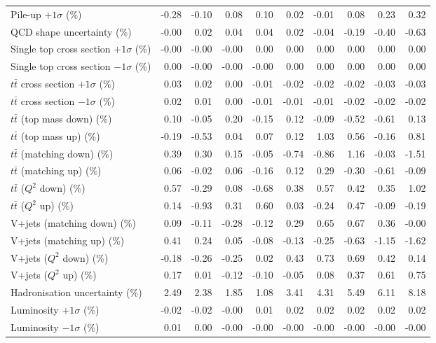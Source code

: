 \begin{table}[htbp]
{\begin{tabular}{lrrrrrrrrr}
Pile-up $+1\sigma$ (\%) & -0.28 & -0.10 & 0.08 & 0.10 & 0.02 & -0.01 & 0.08 & 0.23 & 0.32 \\ 
QCD shape uncertainty (\%) & -0.00 & 0.02 & 0.04 & 0.04 & 0.02 & -0.04 & -0.19 & -0.40 & -0.63 \\ 
Single top cross section $+1\sigma$ (\%) & -0.00 & -0.00 & -0.00 & 0.00 & 0.00 & 0.00 & 0.00 & 0.00 & 0.00 \\ 
Single top cross section $-1\sigma$ (\%) & 0.00 & -0.00 & -0.00 & -0.00 & 0.00 & 0.00 & 0.00 & 0.00 & 0.00 \\ 
$t\bar{t}$ cross section $+1\sigma$ (\%) & 0.03 & 0.02 & 0.00 & -0.01 & -0.02 & -0.02 & -0.02 & -0.03 & -0.03 \\ 
$t\bar{t}$ cross section $-1\sigma$ (\%) & 0.02 & 0.01 & 0.00 & -0.01 & -0.01 & -0.01 & -0.02 & -0.02 & -0.02 \\ 
$t\bar{t}$ (top mass down) (\%) & 0.10 & -0.05 & 0.20 & -0.15 & 0.12 & -0.09 & -0.52 & -0.61 & 0.13 \\ 
$t\bar{t}$ (top mass up) (\%) & -0.19 & -0.53 & 0.04 & 0.07 & 0.12 & 1.03 & 0.56 & -0.16 & 0.81 \\ 
$t\bar{t}$ (matching down) (\%) & 0.39 & 0.30 & 0.15 & -0.05 & -0.74 & -0.86 & 1.16 & -0.03 & -1.51 \\ 
$t\bar{t}$ (matching up) (\%) & 0.06 & -0.02 & 0.06 & -0.16 & 0.12 & 0.29 & -0.30 & -0.61 & -0.09 \\ 
$t\bar{t}$ ($Q^{2}$ down) (\%) & 0.57 & -0.29 & 0.08 & -0.68 & 0.38 & 0.57 & 0.42 & 0.35 & 1.02 \\ 
$t\bar{t}$ ($Q^{2}$ up) (\%) & 0.14 & -0.93 & 0.31 & 0.60 & 0.03 & -0.24 & 0.47 & -0.09 & -0.19 \\ 
V+jets (matching down) (\%) & 0.09 & -0.11 & -0.28 & -0.12 & 0.29 & 0.65 & 0.67 & 0.36 & -0.00 \\ 
V+jets (matching up) (\%) & 0.41 & 0.24 & 0.05 & -0.08 & -0.13 & -0.25 & -0.63 & -1.15 & -1.62 \\ 
V+jets ($Q^{2}$ down) (\%) & -0.18 & -0.26 & -0.25 & 0.02 & 0.43 & 0.73 & 0.69 & 0.42 & 0.14 \\ 
V+jets ($Q^{2}$ up) (\%) & 0.17 & 0.01 & -0.12 & -0.10 & -0.05 & 0.08 & 0.37 & 0.61 & 0.75 \\ 
Hadronisation uncertainty (\%) & 2.49 & 2.38 & 1.85 & 1.08 & 3.41 & 4.31 & 5.49 & 6.11 & 8.18 \\ 
Luminosity $+1\sigma$ (\%) & -0.02 & -0.02 & -0.00 & 0.01 & 0.02 & 0.02 & 0.02 & 0.02 & 0.02 \\ 
Luminosity $-1\sigma$ (\%) & 0.01 & 0.00 & -0.00 & -0.00 & -0.00 & -0.00 & -0.00 & -0.00 & -0.00 \\ 

\end{tabular}}
\end{table}
